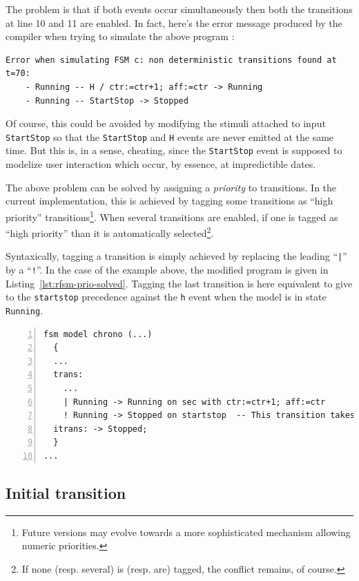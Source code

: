 The problem is that if both events occur simultaneously  then
both the transitions at line 10 and 11 are enabled. In fact, here's the error message produced by
the compiler when trying to simulate the above program :

\small
\begin{verbatim}
Error when simulating FSM c: non deterministic transitions found at t=70:
	- Running -- H / ctr:=ctr+1; aff:=ctr -> Running
	- Running -- StartStop -> Stopped
\end{verbatim}
\normalsize

Of course, this could be avoided by modifying the stimuli attached to input \verb|StartStop| so that
the \texttt{StartStop} and \texttt{H} events are never emitted at the same time. But this is, in a
sense, cheating, since the \texttt{StartStop} event is supposed to modelize user interaction which
occur, by essence, at impredictible dates.

The above problem can be solved by assigning a \emph{priority} to transitions. In the current
implementation, this is achieved by tagging some transitions as ``high priority''
transitions\footnote{Future versions may evolve towards a more sophisticated mechanism allowing
  numeric priorities.}.  When several transitions are enabled, if one is tagged as ``high priority''
than it is automatically selected\footnote{If none (resp. several) is (resp. are) tagged, the
  conflict remains, of course.}. 

Syntaxically, tagging a transition is simply achieved by replacing the leading ``\verb+|+'' by a
``\verb|!|''.  In the
case of the example above, the modified program is given in
Listing~\ref{lst:rfsm-prio-solved}. Tagging the last transition is here equivalent to give to the
\verb|startstop| precedence against the \verb|h| event when the model is in state
\verb|Running|.

\begin{lstlisting}[language=Rfsm,frame=single,numbers=left,caption=A rewriting of the model defined
  in Listing~\ref{lst:rfsm-prio-pb}, label={lst:rfsm-prio-solved},float]
fsm model chrono (...)
  {
  ...
  trans:
    ...
    | Running -> Running on sec with ctr:=ctr+1; aff:=ctr
    ! Running -> Stopped on startstop  -- This transition takes priority on the others
  itrans: -> Stopped;
  }
...
\end{lstlisting}

\subsection{Initial transition}
\label{sec:initial-transition}

